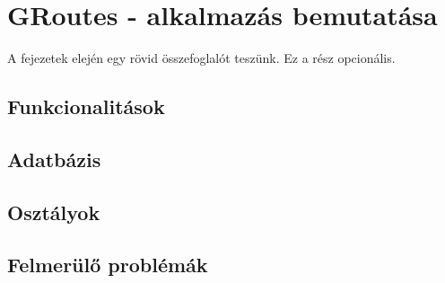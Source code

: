 \chapter{GRoutes - alkalmazás bemutatása}\label{ch:ALAP}

\begin{osszefoglal}
	A fejezetek elején egy rövid összefoglalót teszünk. Ez a rész opcionális.
	
\end{osszefoglal}

\section{Funkcionalitások}\label{sec:ALAP:adatelem}

\section{Adatbázis}\label{sec:ALAP:adatelem}

\section{Osztályok}\label{sec:ALAP:adatelem}

\section{Felmerülő problémák}\label{sec:ALAP:adatelem}

